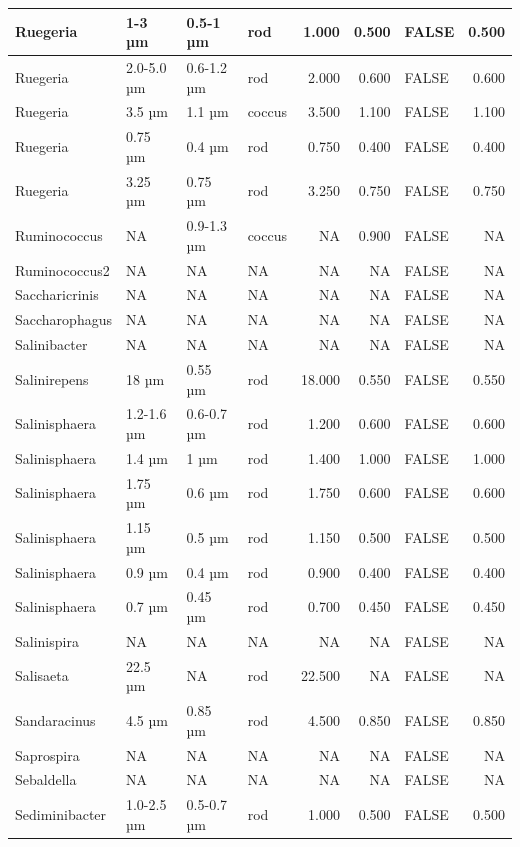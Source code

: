 \documentclass[
]{article}
\begin{document}
\begin{table}
\begin{tabular}{l|l|l|l|r|r|l|r}
\hline
Ruegeria & 1-3 µm & 0.5-1 µm & rod & 1.000 & 0.500 & FALSE & 0.500\\
\hline
Ruegeria & 2.0-5.0 µm & 0.6-1.2 µm & rod & 2.000 & 0.600 & FALSE & 0.600\\
\hline
Ruegeria & 3.5 µm & 1.1 µm & coccus & 3.500 & 1.100 & FALSE & 1.100\\
\hline
Ruegeria & 0.75 µm & 0.4 µm & rod & 0.750 & 0.400 & FALSE & 0.400\\
\hline
Ruegeria & 3.25 µm & 0.75 µm & rod & 3.250 & 0.750 & FALSE & 0.750\\
\hline
Ruminococcus & NA & 0.9-1.3 µm & coccus & NA & 0.900 & FALSE & NA\\
\hline
Ruminococcus2 & NA & NA & NA & NA & NA & FALSE & NA\\
\hline
Saccharicrinis & NA & NA & NA & NA & NA & FALSE & NA\\
\hline
Saccharophagus & NA & NA & NA & NA & NA & FALSE & NA\\
\hline
Salinibacter & NA & NA & NA & NA & NA & FALSE & NA\\
\hline
Salinirepens & 18 µm & 0.55 µm & rod & 18.000 & 0.550 & FALSE & 0.550\\
\hline
Salinisphaera & 1.2-1.6 µm & 0.6-0.7 µm & rod & 1.200 & 0.600 & FALSE & 0.600\\
\hline
Salinisphaera & 1.4 µm & 1 µm & rod & 1.400 & 1.000 & FALSE & 1.000\\
\hline
Salinisphaera & 1.75 µm & 0.6 µm & rod & 1.750 & 0.600 & FALSE & 0.600\\
\hline
Salinisphaera & 1.15 µm & 0.5 µm & rod & 1.150 & 0.500 & FALSE & 0.500\\
\hline
Salinisphaera & 0.9 µm & 0.4 µm & rod & 0.900 & 0.400 & FALSE & 0.400\\
\hline
Salinisphaera & 0.7 µm & 0.45 µm & rod & 0.700 & 0.450 & FALSE & 0.450\\
\hline
Salinispira & NA & NA & NA & NA & NA & FALSE & NA\\
\hline
Salisaeta & 22.5 µm & NA & rod & 22.500 & NA & FALSE & NA\\
\hline
Sandaracinus & 4.5 µm & 0.85 µm & rod & 4.500 & 0.850 & FALSE & 0.850\\
\hline
Saprospira & NA & NA & NA & NA & NA & FALSE & NA\\
\hline
Sebaldella & NA & NA & NA & NA & NA & FALSE & NA\\
\hline
Sediminibacter & 1.0-2.5 µm & 0.5-0.7 µm & rod & 1.000 & 0.500 & FALSE & 0.500\\
\hline

\end{tabular}
\end{table}
\end{document}
